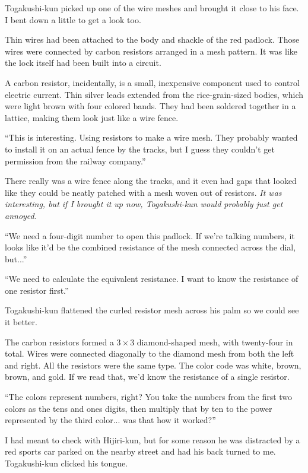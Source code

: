 \documentclass[
    a4paper,
    12pt,
    twoside,
    openany,
    UTF8,
    fontset=windows
]{ctexbook}
\begin{document}
Togakushi-kun picked up one of the wire meshes and brought it close to his face. I bent down a little to get a look too.

Thin wires had been attached to the body and shackle of the red padlock. Those wires were connected by carbon resistors arranged in a mesh pattern. It was like the lock itself had been built into a circuit.

A carbon resistor, incidentally, is a small, inexpensive component used to control electric current. Thin silver leads extended from the rice-grain-sized bodies, which were light brown with four colored bands. They had been soldered together in a lattice, making them look just like a wire fence.

``This is interesting. Using resistors to make a wire mesh. They probably wanted to install it on an actual fence by the tracks, but I guess they couldn't get permission from the railway company.''

There really was a wire fence along the tracks, and it even had gaps that looked like they could be neatly patched with a mesh woven out of resistors. \textit{It was interesting, but if I brought it up now, Togakushi-kun would probably just get annoyed.}

``We need a four-digit number to open this padlock. If we're talking numbers, it looks like it'd be the combined resistance of the mesh connected across the dial, but...''

``We need to calculate the equivalent resistance. I want to know the resistance of one resistor first.''

Togakushi-kun flattened the curled resistor mesh across his palm so we could see it better.

The carbon resistors formed a $3 \times 3$ diamond-shaped mesh, with twenty-four in total. Wires were connected diagonally to the diamond mesh from both the left and right. All the resistors were the same type. The color code was white, brown, brown, and gold. If we read that, we'd know the resistance of a single resistor.

``The colors represent numbers, right? You take the numbers from the first two colors as the tens and ones digits, then multiply that by ten to the power represented by the third color... was that how it worked?''

I had meant to check with Hijiri-kun, but for some reason he was distracted by a red sports car parked on the nearby street and had his back turned to me. Togakushi-kun clicked his tongue.
\end{document}
